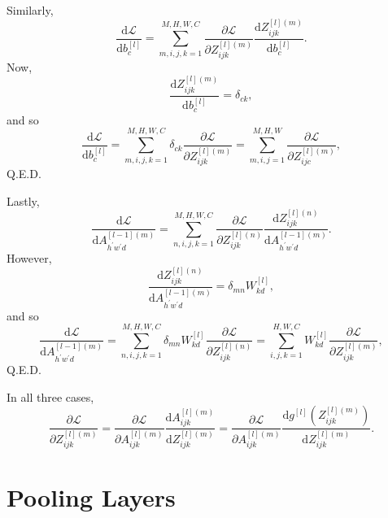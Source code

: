 \documentclass[modern]{aastex61}
\newcommand{\uderivative}{\mathrm{d}}
\begin{document}
Similarly,
\begin{equation*}
  \frac{\uderivative \mathscr{L}}{\uderivative b^{[l]}_{c}} = \sum_{m,i,j,k=1}^{M,H,W,C} \frac{\partial \mathscr{L}}{\partial Z^{[l](m)}_{ijk}} \frac{\uderivative Z^{[l](m)}_{ijk}}{\uderivative b^{[l]}_{c}}.
\end{equation*}
Now,
\begin{equation*}
  \frac{\uderivative Z^{[l](m)}_{ijk}}{\uderivative b^{[l]}_{c}} = \delta_{ck},
\end{equation*}
and so
\begin{equation*}
  \frac{\uderivative \mathscr{L}}{\uderivative b^{[l]}_{c}} = \sum_{m,i,j,k=1}^{M,H,W,C} \delta_{ck} \frac{\partial \mathscr{L}}{\partial Z^{[l](m)}_{ijk}} = \sum_{m,i,j=1}^{M,H,W} \frac{\partial \mathscr{L}}{\partial Z^{[l](m)}_{ijc}},
\end{equation*}
Q.E.D.

Lastly,
\begin{equation*}
  \frac{\uderivative \mathscr{L}}{\uderivative A^{[l-1](m)}_{h^{'}w^{'}d}} = \sum_{n,i,j,k=1}^{M,H,W,C} \frac{\partial \mathscr{L}}{\partial Z^{[l](n)}_{ijk}} \frac{\uderivative Z^{[l](n)}_{ijk}}{\uderivative A^{[l-1](m)}_{h^{'}w^{'}d}}.
\end{equation*}
However,
\begin{equation*}
  \frac{\uderivative Z^{[l](n)}_{ijk}}{\uderivative A^{[l-1](m)}_{h^{'}w^{'}d}} = \delta_{mn} W^{[l]}_{kd},
\end{equation*}
and so
\begin{equation*}
  \frac{\uderivative \mathscr{L}}{\uderivative A^{[l-1](m)}_{h^{'}w^{'}d}} = \sum_{n,i,j,k=1}^{M,H,W,C} \delta_{mn}  W^{[l]}_{kd} \frac{\partial \mathscr{L}}{\partial Z^{[l](n)}_{ijk}} = \sum_{i,j,k=1}^{H,W,C} W^{[l]}_{kd} \frac{\partial \mathscr{L}}{\partial Z^{[l](m)}_{ijk}},
\end{equation*}
Q.E.D.

In all three cases,
\begin{equation*}
  \frac{\partial \mathscr{L}}{\partial Z^{[l](m)}_{ijk}} = \frac{\partial \mathscr{L}}{\partial A^{[l](m)}_{ijk}} \frac{\uderivative A^{[l](m)}_{ijk}}{\uderivative Z^{[l](m)}_{ijk}} = \frac{\partial \mathscr{L}}{\partial A^{[l](m)}_{ijk}} \frac{\uderivative g^{[l]}(Z^{[l](m)}_{ijk})}{\uderivative Z^{[l](m)}_{ijk}}.
\end{equation*}

\section{Pooling Layers} \label{sec:pool}
\end{document}
